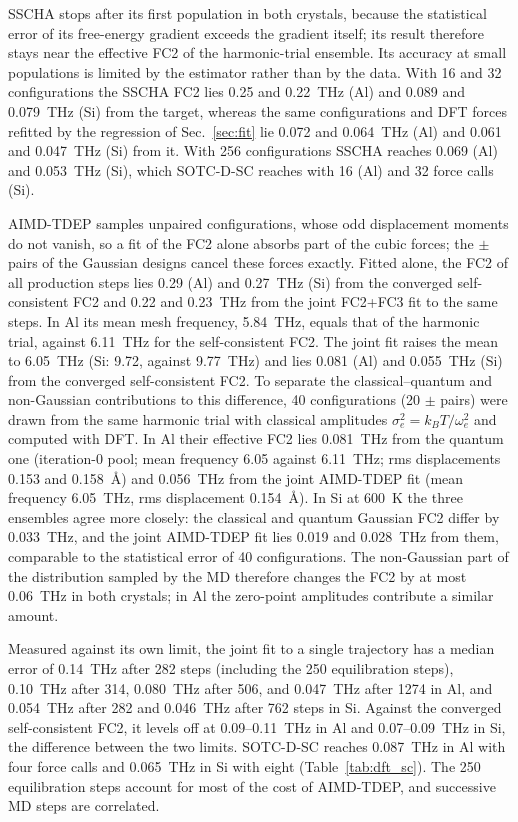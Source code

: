\documentclass[aip,jap,reprint,amsmath,amssymb,floatfix]{revtex4-2}
\begin{document}
SSCHA stops after its first population in both crystals, because the
statistical error of its free-energy gradient exceeds the gradient itself;
its result therefore stays near the effective FC2 of the harmonic-trial
ensemble. Its accuracy at small populations is limited by the estimator
rather than by the data. With 16 and 32 configurations the SSCHA FC2 lies 0.25
and 0.22~THz (Al) and 0.089 and 0.079~THz (Si) from the target, whereas the
same configurations and DFT forces refitted by the regression of
Sec.~\ref{sec:fit} lie 0.072 and 0.064~THz (Al) and 0.061 and 0.047~THz
(Si) from it. With 256 configurations SSCHA reaches 0.069 (Al) and
0.053~THz (Si), which SOTC-D-SC reaches with 16 (Al) and 32 force
calls (Si).

AIMD-TDEP samples unpaired configurations, whose odd displacement moments
do not vanish, so a fit of the FC2 alone absorbs part of the cubic forces;
the $\pm$ pairs of the Gaussian designs cancel these forces exactly. Fitted
alone, the FC2 of all production steps lies 0.29 (Al) and 0.27~THz (Si) from
the converged self-consistent FC2 and 0.22 and 0.23~THz from the joint
FC2+FC3 fit to the same steps. In Al its mean mesh frequency, 5.84~THz,
equals that of the harmonic trial, against 6.11~THz for the
self-consistent FC2. The joint fit raises the mean to 6.05~THz (Si: 9.72,
against 9.77~THz) and lies 0.081 (Al) and 0.055~THz (Si) from the converged
self-consistent FC2. To separate the classical--quantum and non-Gaussian
contributions to this difference, 40 configurations (20
$\pm$ pairs) were drawn from the same harmonic trial with classical
amplitudes $\sigma_e^2=k_BT/\omega_e^2$ and computed with DFT. In Al their
effective FC2 lies 0.081~THz from the quantum one (iteration-0 pool; mean
frequency 6.05 against 6.11~THz; rms displacements 0.153 and 0.158~\AA) and
0.056~THz from the joint AIMD-TDEP fit (mean frequency 6.05~THz, rms
displacement 0.154~\AA). In Si at 600~K the
three ensembles agree more closely: the classical and quantum Gaussian FC2
differ by 0.033~THz, and the joint AIMD-TDEP fit lies 0.019 and 0.028~THz
from them, comparable to the statistical error of 40 configurations. The
non-Gaussian part of the distribution sampled by the MD therefore changes
the FC2 by at most 0.06~THz in both crystals; in Al the zero-point
amplitudes contribute a similar amount.

Measured against its own limit, the joint fit to a single trajectory has a
median error of 0.14~THz after 282 steps (including the 250 equilibration
steps), 0.10~THz after 314, 0.080~THz after 506, and 0.047~THz after 1274 in
Al, and 0.054~THz after 282 and 0.046~THz after 762 steps in Si. Against the
converged self-consistent FC2, it levels off at 0.09--0.11~THz in Al and
0.07--0.09~THz in Si, the difference between the two limits. SOTC-D-SC reaches
0.087~THz in Al with four force calls and 0.065~THz in Si with eight
(Table~\ref{tab:dft_sc}). The 250 equilibration steps account for most of
the cost of AIMD-TDEP, and successive MD steps are correlated.
\end{document}

